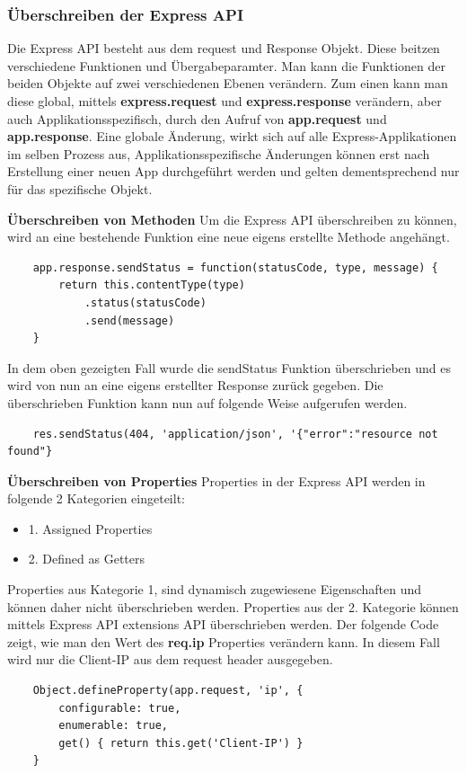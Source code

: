 \subsubsection{Überschreiben der Express API}
Die Express API besteht aus dem request und Response Objekt. Diese beitzen verschiedene Funktionen und Übergabeparamter. Man kann die Funktionen der beiden Objekte auf zwei verschiedenen Ebenen verändern. Zum einen kann man diese global, mittels \textbf{express.request} und \textbf{express.response} verändern, aber auch Applikationsspezifisch, durch den Aufruf von \textbf{app.request} und \textbf{app.response}. Eine globale Änderung, wirkt sich auf alle Express-Applikationen im selben Prozess aus, Applikationsspezifische Änderungen können erst nach Erstellung einer neuen App durchgeführt werden und gelten dementsprechend nur für das spezifische Objekt. 

\textbf{Überschreiben von Methoden}
\newline
Um die Express API überschreiben zu können, wird an eine bestehende Funktion eine neue eigens erstellte Methode angehängt.
\begin{lstlisting}
    app.response.sendStatus = function(statusCode, type, message) {
        return this.contentType(type)
            .status(statusCode)
            .send(message)
    }
\end{lstlisting}
In dem oben gezeigten Fall wurde die sendStatus Funktion überschrieben und es wird von nun an eine eigens erstellter Response zurück gegeben. Die überschrieben Funktion kann nun auf folgende Weise aufgerufen werden.
\begin{lstlisting}
    res.sendStatus(404, 'application/json', '{"error":"resource not found"}            
\end{lstlisting}

\textbf{Überschreiben von Properties}
\newline
Properties in der Express API werden in folgende 2 Kategorien eingeteilt: 
\begin{itemize}
    \item 1. Assigned Properties
    \item 2. Defined as Getters
\end{itemize}
Properties aus Kategorie 1, sind dynamisch zugewiesene Eigenschaften und können daher nicht überschrieben werden. Properties aus der 2. Kategorie können mittels Express API extensions API überschrieben werden. Der folgende Code zeigt, wie man den Wert des \textbf{req.ip} Properties verändern kann. In diesem Fall wird nur die Client-IP aus dem request header ausgegeben.
\begin{lstlisting}
    Object.defineProperty(app.request, 'ip', {
        configurable: true,
        enumerable: true,
        get() { return this.get('Client-IP') }
    }
\end{lstlisting}

